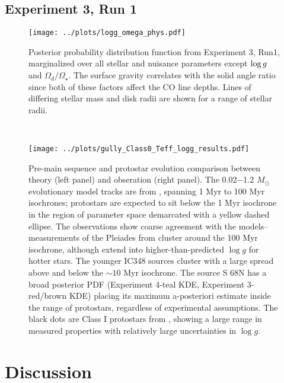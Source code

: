 \documentclass[twocolumn]{emulateapj}%
\begin{document}
\subsection{Experiment 3, Run 1}


\begin{figure}
 \centering
 \texttt{[image: ../plots/logg\_omega\_phys.pdf]}
 \caption{Posterior probability distribution function from Experiment 3, Run1, marginalized over all stellar and nuisance parameters except $\log g$ and $\Omega_d/\Omega_\star$.  The surface gravity correlates with the solid angle ratio since both of these factors affect the CO line depths.  Lines of differing stellar mass and disk radii are shown for a range of stellar radii.}
 \label{fig:posterior_loggOmega}
\end{figure}


~\clearpage

\begin{figure*}[b]
 \centering
 \texttt{[image: ../plots/gully\_Class0\_Teff\_logg\_results.pdf]}
 \caption{Pre-main sequence and protostar evolution comparison between theory (left panel) and obseration (right panel).  The 0.02$-$1.2 $M_{\odot}$ evolutionary model tracks are from \citet{baraffe15}, spanning 1 Myr to 100 Myr isochrones; protostars are expected to sit below the 1 Myr isochrone in the region of parameter space demarcated with a yellow dashed ellipse.  The observations show coarse agreement with the models-- measurements of the Pleiades from \citet[green KDE]{cottaar14} cluster around the 100 Myr isochrone, although extend into higher-than-predicted $\log{g}$ for hotter stars.  The younger IC348 sources \citep[purple KDE]{cottaar14} cluster with a large spread above and below the $\sim10$ Myr isochrone.  The source S 68N has a broad posterior PDF (Experiment 4-teal KDE, Experiment 3- red/brown KDE) placing its maximum a-posteriori estimate inside the range of protostars, regardless of experimental assumptions.  The black dots are Class I protostars from \citet{2005AJ....130.1145D}, showing a large range in measured properties with relatively large uncertainties in $\log{g}$.}  
 \label{fig:theory_v_obs}
\end{figure*}



\section{Discussion}


\clearpage
\pagebreak
\end{document}
